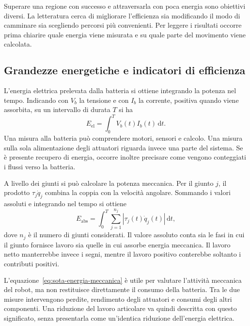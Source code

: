 Superare una regione con successo e attraversarla con poca energia sono obiettivi diversi. La letteratura cerca di migliorare l'efficienza sia modificando il modo di camminare sia scegliendo percorsi più convenienti. Per leggere i risultati occorre prima chiarire quale energia viene misurata e su quale parte del movimento viene calcolata.

\subsection{Grandezze energetiche e indicatori di efficienza}

L'energia elettrica prelevata dalla batteria si ottiene integrando la potenza nel tempo. Indicando con $V_b$ la tensione e con $I_b$ la corrente, positiva quando viene assorbita, su un intervallo di durata $T$ si ha
\begin{equation}
    E_{\mathrm{el}}=\int_0^T V_b(t)I_b(t)\,\mathrm{d}t.
    \label{eq:sota-energia-elettrica}
\end{equation}
Una misura alla batteria può comprendere motori, sensori e calcolo. Una misura sulla sola alimentazione degli attuatori riguarda invece una parte del sistema. Se è presente recupero di energia, occorre inoltre precisare come vengono conteggiati i flussi verso la batteria.

A livello dei giunti si può calcolare la potenza meccanica. Per il giunto $j$, il prodotto $\tau_j\dot q_j$ combina la coppia con la velocità angolare. Sommando i valori assoluti e integrando nel tempo si ottiene
\begin{equation}
    E_{\mathrm{abs}}=\int_0^T\sum_{j=1}^{n_j}
    \left|\tau_j(t)\dot q_j(t)\right|\,\mathrm{d}t,
    \label{eq:sota-energia-meccanica}
\end{equation}
dove $n_j$ è il numero di giunti considerati. Il valore assoluto conta sia le fasi in cui il giunto fornisce lavoro sia quelle in cui assorbe energia meccanica. Il lavoro netto manterrebbe invece i segni, mentre il lavoro positivo conterebbe soltanto i contributi positivi.

L'equazione~\eqref{eq:sota-energia-meccanica} è utile per valutare l'attività meccanica del robot, ma non restituisce direttamente il consumo della batteria. Tra le due misure intervengono perdite, rendimento degli attuatori e consumi degli altri componenti. Una riduzione del lavoro articolare va quindi descritta con questo significato, senza presentarla come un'identica riduzione dell'energia elettrica.

